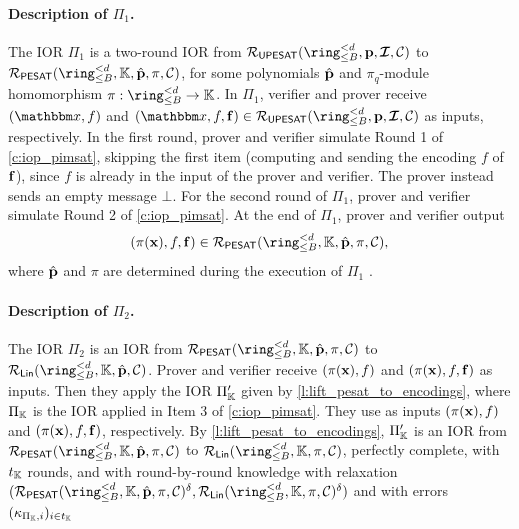 \documentclass[11pt,letterpaper,usenames,dvipsnames]{article}
\begin{document}
\paragraph{Description of $\Pi_1$.} The IOR $\Pi_1$ is a two-round IOR from $\PIMSAT(\ringtwobounds{B}{\moduledegree}, \pp,\bm{\ideal}, \cC)$ to $\PESAT(\ringtwobounds{B}{\moduledegree},\KK, \hat{\pp},\pi,\cC)$, for some polynomials $\hat{\mathbf{p}}$ and $\pi_q$-module homomorphism $\pi:\ringtwobounds{B}{\moduledegree} \to \KK$. In $\Pi_1$, verifier and prover receive $(\inp, f)$ and $(\inp, f,\bff)\in \PIMSAT(\ringtwobounds{B}{\moduledegree}, \pp,\bm{\ideal}, \cC)$ as inputs, respectively. In the first round, prover and verifier simulate Round 1 of \cref{c:iop_pimsat}, skipping the first item (computing and sending the encoding $f$ of $\mathbf{f}$), since $f$ is already in the input of the prover and verifier. The prover instead  sends an empty message $\bot$. For the second round of $\Pi_1$, prover and verifier simulate Round 2 of \cref{c:iop_pimsat}. At the end of $\Pi_1$, prover and verifier output $$(\pi(\xx),f,\bff)\in \PESAT(\ringtwobounds{B}{\moduledegree},\KK, \hat{\pp},\pi,\cC),$$
where $\hat{\mathbf{p}}$ and $\pi$ are determined during the execution of $\Pi_1$ .
%

\paragraph{Description of $\Pi_2$.} 
The IOR $\Pi_2$ is an IOR from $\PESAT(\ringtwobounds{B}{\moduledegree},\KK, \hat{\pp},\pi,\cC)$ to $\LIN(\ringtwobounds{B}{\moduledegree},\KK, \hat{\pp},\cC)$. Prover and verifier receive $(\pi(\mathbf{x}),f)$ and $(\pi(\mathbf{x}),f,\mathbf{f})$ as inputs. Then they  apply the IOR
$\Pi_{\mathbb{K}}'$ given by \cref{l:lift_pesat_to_encodings}, where $\Pi_{\mathbb{K}}$ is the IOR applied in Item 3 of \cref{c:iop_pimsat}. They use as inputs $(\pi(\mathbf{x}),f)$ and $(\pi(\mathbf{x}),f,\mathbf{f})$, respectively. By \cref{l:lift_pesat_to_encodings}, $\Pi_{\mathbb{K}}'$ is an IOR from $\PESAT(\ringtwobounds{B}{\moduledegree},\KK, \hat{\pp},\pi, \cC)$ to $\LIN(\ringtwobounds{B}{\moduledegree},\KK,\pi,\cC)$, perfectly complete, with $t_{\mathbb{K}}$ rounds, and with round-by-round knowledge with relaxation  $(\PESAT(\ringtwobounds{B}{\moduledegree},\KK, \hat{\pp}, \pi,\cC)^\delta,\LIN(\ringtwobounds{B}{\moduledegree},\KK,\pi,\cC)^\delta)$ and with errors $(\kappa_{\Pi_{\mathbb{K}},i})_{i\in t_{\mathbb{K}}}$ 
\end{document}
